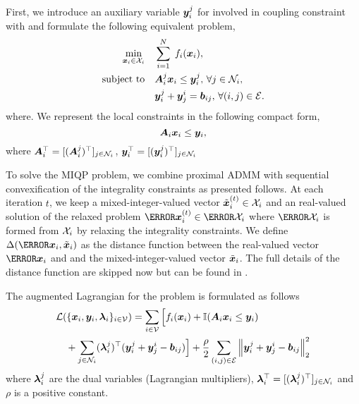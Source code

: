 \documentclass[twocolumn,amsthm]{autart}%
\theoremstyle{definition}
\theoremstyle{plain}
\begin{document}
First, we introduce an auxiliary variable $\boldsymbol{y}_{i}^{j}$ for  involved in coupling constraint with  and formulate the following equivalent problem,
\begin{equation}
\begin{split}
\underset{\boldsymbol{x}_i \in \mathcal{X}_i}{\min} & \quad \sum_{i=1}^N \; f_i (\boldsymbol{x}_i), \\
\text{subject to} & \quad \boldsymbol{A}^{j}_{i} \boldsymbol{x}_i \le \boldsymbol{y}_{i}^{j}, \, \forall j \in \mathcal{N}_i, \\
& \quad \boldsymbol{y}_{i}^{j} + \boldsymbol{y}_{j}^{i} = \boldsymbol{b}_{ij},\, \forall (i,j) \in \mathcal{E}.
\end{split}
\end{equation}
where.
We represent the local constraints in the following compact form, 
\begin{equation}
\boldsymbol{A}_{i} \boldsymbol{x}_i \le \boldsymbol{y}_{i},
\end{equation}
where $\boldsymbol{A}_{i}^\top = [(\boldsymbol{A}_{i}^{j})^\top]_{j \in \mathcal{N}_i}$, $\boldsymbol{y}_{i}^\top = [(\boldsymbol{y}_{i}^{j})^\top]_{j \in \mathcal{N}_i}$

To solve the MIQP problem, we combine proximal ADMM \cite{yang2022proximal} with sequential convexification of the integrality constraints as presented follows.
At each iteration $t$, we keep a mixed-integer-valued vector $\tilde{\boldsymbol{x}}_i^{(t)} \in \mathcal{X}_i$ and an real-valued solution of the relaxed problem $\bar{\bbsym{x}}_i^{(t)} \in \bar{\XXX}_i$ where $\bar{\XXX}_i$ is formed from $\mathcal{X}_i$ by relaxing the integrality constraints.
We define $\Delta (\bar{\bbsym{x}}_i, \tilde{\bbsym{x}}_i)$ as the distance function between the real-valued vector $\bar{\bbsym{x}}_i$ and and the mixed-integer-valued vector $\tilde{\boldsymbol{x}}_i$.
The full details of the distance function are skipped now but can be found in \cite{bertacco2007feasibility}. 

The augmented Lagrangian for the problem is formulated as follows
\begin{equation}
\begin{multlined}
\LLL ( \{ \bbsym{x}_i, \bbsym{y}_i, \bbsym{\lambda}_{i} \}_{i\in \VVV}) = \sum_{i \in \VVV} \Big[ f_i (\bbsym{x}_i) + \II (\bbsym{A}_{i} \bbsym{x}_i \le \bbsym{y}_{i}) \\
+ \sum_{j \in \NNN_i} (\bbsym{\lambda}_{i}^j)^\top (\bbsym{y}_{i}^{j} + \bbsym{y}_{j}^{i} - \bbsym{b}_{ij}) \Big] 
+ \frac{\rho}{2} \sum_{(i,j) \in \EEE} \norm{\bbsym{y}_{i}^{j} + \bbsym{y}_{j}^{i} - \bbsym{b}_{ij}}_2^2
\end{multlined}
\end{equation}
where $\boldsymbol{\lambda}_{i}^j$ are the dual variables (Lagrangian multipliers), $\boldsymbol{\lambda}_{i}^\top = [(\boldsymbol{\lambda}_{i}^j)^\top]_{j \in \mathcal{N}_i}$ and $\rho$ is a positive constant.
\end{document}

